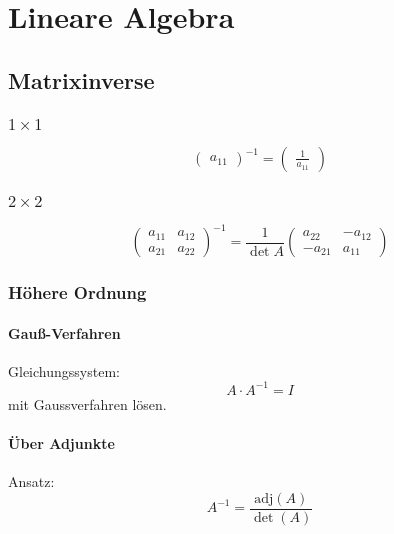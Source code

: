 \chapter{Lineare Algebra}
\section{Matrixinverse}
\subsection{$1 \times 1$}
\begin{equation}
    {\begin{pmatrix}
        a_{11}
    \end{pmatrix}}^{-1} =
    \begin{pmatrix}
        \frac{1}{a_{11}}
    \end{pmatrix} 
\end{equation}

\subsection{$2 \times 2$}
\begin{equation}
    {\begin{pmatrix}
        a_{11} & a_{12} \\
        a_{21} & a_{22}
    \end{pmatrix}}^{-1} =
    \frac{1}{\det A}
    \begin{pmatrix}
        a_{22} & -a_{12} \\
        -a_{21} & a_{11}
    \end{pmatrix} 
\end{equation}

\subsection{Höhere Ordnung}
\subsubsection{Gauß-Verfahren}
Gleichungssystem:
\begin{equation}
    A \cdot A^{-1} = I
\end{equation}
mit Gaussverfahren lösen.

\subsubsection{Über Adjunkte}
Ansatz:
\begin{equation}
    A^{-1} = \frac{\text{adj} (A)}{\det (A)}
\end{equation}

